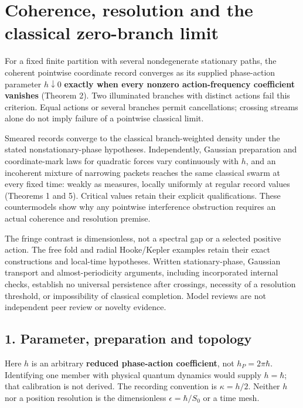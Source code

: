 \documentclass[11pt,a4paper]{article}
\begin{document}
\hypertarget{coherence-resolution-and-the-classical-zero-branch-limit}{%
\section{Coherence, resolution and the classical zero-branch
limit}\label{coherence-resolution-and-the-classical-zero-branch-limit}}

For a fixed finite partition with several nondegenerate stationary
paths, the coherent pointwise coordinate record converges as its
supplied phase-action parameter \(h\downarrow0\) \textbf{exactly when
every nonzero action-frequency coefficient vanishes} (Theorem 2). Two
illuminated branches with distinct actions fail this criterion. Equal
actions or several branches permit cancellations; crossing streams alone
do not imply failure of a pointwise classical limit.

Smeared records converge to the classical branch-weighted density under
the stated nonstationary-phase hypotheses. Independently, Gaussian
preparation and coordinate-mark laws for quadratic forces vary
continuously with \(h\), and an incoherent mixture of narrowing packets
reaches the same classical swarm at every fixed time: weakly as
measures, locally uniformly at regular record values (Theorems 1 and 5).
Critical values retain their explicit qualifications. These
countermodels show why any pointwise interference obstruction requires
an actual coherence and resolution premise.

The fringe contrast is dimensionless, not a spectral gap or a selected
positive action. The free fold and radial Hooke/Kepler examples retain
their exact constructions and local-time hypotheses. Written
stationary-phase, Gaussian transport and almost-periodicity arguments,
including incorporated internal checks, establish no universal
persistence after crossings, necessity of a resolution threshold, or
impossibility of classical completion. Model reviews are not independent
peer review or novelty evidence.

\hypertarget{parameter-preparation-and-topology}{%
\subsection{1. Parameter, preparation and
topology}\label{parameter-preparation-and-topology}}

Here \(h\) is an arbitrary \textbf{reduced phase-action coefficient},
not \(h_P=2\pi\hbar\). Identifying one member with physical quantum
dynamics would supply \(h=\hbar\); that calibration is not derived. The
recording convention is \(\kappa=h/2\). Neither \(h\) nor a position
resolution is the dimensionless \(\epsilon=\hbar/S_0\) or a time mesh.
\end{document}
